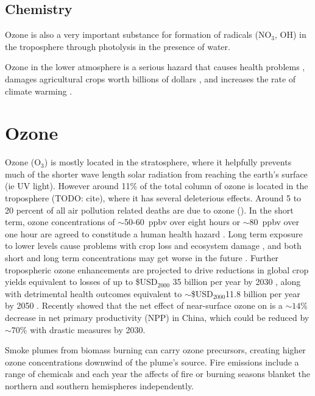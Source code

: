   \subsection{Chemistry}
  \label{LR:Atmos:Chem}
    
    Ozone is also a very important substance for formation of radicals (NO$_3$, OH) in the troposphere through photolysis in the presence of water.
    
    
    
    Ozone in the lower atmosphere is a serious hazard that causes health problems \citep{Hsieh2013}, damages agricultural crops worth billions of dollars \citep{Avnery2011,Yue2017}, and increases the rate of climate warming \citep{IPCC_2013_chap8}.

\section{Ozone}
\label{LR:O3}
  Ozone (O$_3$) is mostly located in the stratosphere, where it helpfully prevents much of the shorter wave length solar radiation from reaching the earth's surface (ie UV light).
  However around 11\% of the total column of ozone is located in the troposphere (TODO: cite), where it has several deleterious effects.
  Around 5 to 20 percent of all air pollution related deaths are due to ozone (\cite{Monks2015}).
  In the short term, ozone concentrations of $\sim$50-60~ppbv over eight hours or $\sim$80~ppbv over one hour are agreed to constitude a human health hazard \citep{Ayers2006,Lelieveld2009}. 
  Long term exposure to lower levels cause problems with crop loss and ecosystem damage \citep{Emberson2003}, and both short and long term concentrations may get worse in the future \citep{Lelieveld2009, Stevenson2013}.
  Further tropospheric ozone enhancements are projected to drive reductions in global crop yields equivalent to losses of up to \$USD$_{2000}$ 35 billion per year by 2030 \citep{Avnery2011}, along with detrimental health outcomes equivalent to $\sim$\$USD$_{2000}$11.8 billion per year by 2050 \citep{Selin2009}.
  Recently \cite{Yue2017} showed that the net effect of near-surface ozone on is a $\sim 14\%$ decrease in net primary productivity (NPP) in China, which could be reduced by $\sim 70\%$ with drastic measures by 2030.
  
  
  
  Smoke plumes from biomass burning can carry ozone precursors, creating higher ozone concentrations downwind of the plume's source.
  Fire emissions include a range of chemicals and each year the affects of fire or burning seasons blanket the northern and southern hemispheres independently.
  
